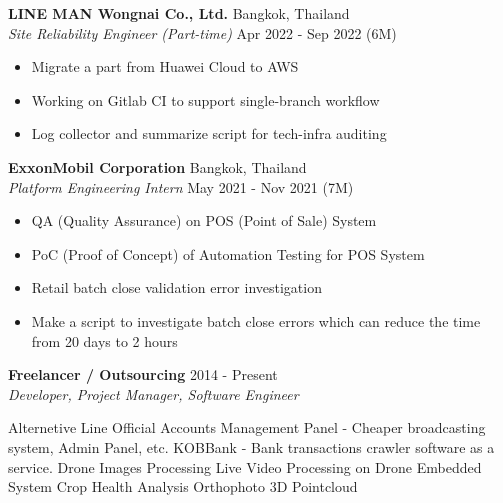 \vspace{-1mm}
\textbf{LINE MAN Wongnai Co., Ltd.} \hfill Bangkok, Thailand\\
\textit{Site Reliability Engineer (Part-time)} \hfill Apr 2022 - Sep 2022 (6M)\\
\vspace{-1mm}
\begin{itemize}
	\item Migrate a part from Huawei Cloud to AWS
	\item Working on Gitlab CI to support single-branch workflow
	\item Log collector and summarize script for tech-infra auditing
\end{itemize}
\vspace{-1mm}
\textbf{ExxonMobil Corporation} \hfill Bangkok, Thailand\\
\textit{Platform Engineering Intern} \hfill May 2021 - Nov 2021 (7M)\\
\vspace{-1mm}
\begin{itemize}
	\item QA (Quality Assurance) on POS (Point of Sale) System
	\item PoC (Proof of Concept) of Automation Testing for POS System
	\item Retail batch close validation error investigation
	\item Make a script to investigate batch close errors which can reduce the time from 20 days to 2 hours
\end{itemize}
\vspace{-1mm}
\textbf{Freelancer / Outsourcing} \hfill 2014 - Present\\
\textit{Developer, Project Manager, Software Engineer}\\
\vspace{-1mm}
\begin{outline}
	    \1 Alternetive Line Official Accounts Management Panel - Cheaper broadcasting system, Admin Panel, etc.
	    \1 KOBBank - Bank transactions crawler software as a service.
		\1 Drone Images Processing 
			\2 Live Video Processing on Drone Embedded System
			\2 Crop Health Analysis
			\2 Orthophoto
			\2 3D Pointcloud
\end{outline}
\vspace{2mm}

